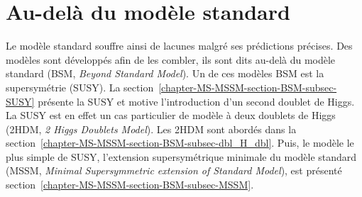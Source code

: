 \section{Au-delà du modèle standard}\label{chapter-MS-MSSM-section-BSM}
Le modèle standard souffre ainsi de lacunes malgré ses prédictions précises.
Des modèles sont développés afin de les combler, ils sont dits \og au-delà \fg{} du modèle standard (BSM, \emph{Beyond Standard Model}).
Un de ces modèles BSM est la supersymétrie (SUSY).
La section~\ref{chapter-MS-MSSM-section-BSM-subsec-SUSY} présente la SUSY et motive l'introduction d'un second doublet de Higgs.
La SUSY est en effet un cas particulier de modèle à deux doublets de Higgs (2HDM, \emph{2 Higgs Doublets Model}).
Les 2HDM sont abordés dans la section~\ref{chapter-MS-MSSM-section-BSM-subsec-dbl_H_dbl}.
Puis, le modèle le plus simple de SUSY, l'extension supersymétrique minimale du modèle standard (MSSM, \emph{Minimal Supersymmetric extension of Standard Model}), est présenté section~\ref{chapter-MS-MSSM-section-BSM-subsec-MSSM}.
